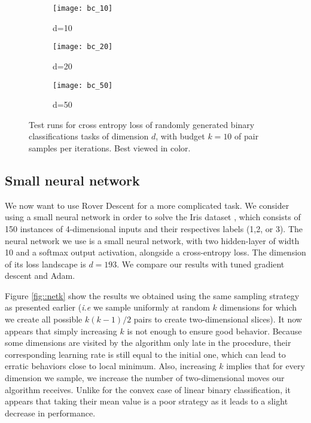 {{			\begin{figure}[h!]
			\centering
			\begin{subfigure}[b]{0.33\linewidth}
			{
				\centering
				\texttt{[image: bc\_10]}
				\caption{d=10}
				\label{fig::bc_10}
			}
			\end{subfigure}\hfill
			\begin{subfigure}[b]{0.33\linewidth}
			{
				\centering
				\texttt{[image: bc\_20]}
				\caption{d=20}
				\label{fig::bc_20}
			}
			\end{subfigure}\hfill
			\begin{subfigure}[b]{0.33\linewidth}
			{
				\centering
				\texttt{[image: bc\_50]}
				\caption{d=50}
				\label{fig::bc_50}
			}
			\end{subfigure}
			\caption[Test runs for cross entropy loss of randomly generated binary classifications]{Test runs for cross entropy loss of randomly generated binary classifications tasks of dimension $d$, with budget $k=10$ of pair samples per iterations. Best viewed in color.}
			\label{fig::highd}
		\end{figure}


		}
		
		\subsection{Small neural network}
		{
			\label{sec::net_exp}
			We now want to use Rover Descent for a more complicated task. We consider using a small neural network in order to solve the Iris dataset \cite{fisher1936use}, which consists of 150 instances of 4-dimensional inputs and their respectives labels (1,2, or 3). The neural network we use is a small neural network, with two hidden-layer of width 10 and a softmax output activation, alongside a cross-entropy loss. The dimension of its loss landscape is $d=193$. We compare our results with tuned gradient descent and Adam. 
			
			Figure \ref{fig::netk} show the results we obtained using the same sampling strategy as presented earlier (\emph{i.e} we sample uniformly at random $k$ dimensions for which we create all possible $k(k-1)/2$ pairs to create two-dimensional slices). It now appears that simply increasing $k$ is not enough to ensure good behavior. Because some dimensions are visited by the algorithm only late in the procedure, their corresponding learning rate is still equal to the initial one, which can lead to erratic behaviors close to local minimum. Also, increasing $k$ implies that for every dimension we sample, we increase the number of two-dimensional moves our algorithm receives. Unlike for the convex case of linear binary classification, it appears that taking their mean value is a poor strategy as it leads to a slight decrease in performance. 
			
}}
